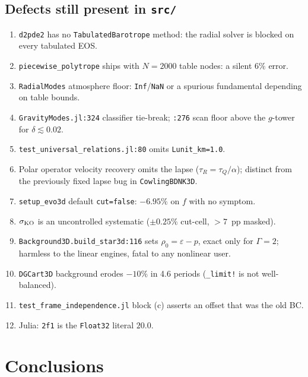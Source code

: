 \documentclass[aps,prd,preprint,amsmath,amssymb,nofootinbib,longbibliography]{revtex4-2}
\begin{document}
\subsection{Defects still present in \texttt{src/}}
\begin{enumerate}
\item \texttt{d2pde2} has no \texttt{TabulatedBarotrope} method: the radial solver is blocked on
every tabulated EOS.
\item \texttt{piecewise\_polytrope} ships with $N=2000$ table nodes: a silent $6\%$ error.
\item \texttt{RadialModes} atmosphere floor: \texttt{Inf}/\texttt{NaN} or a spurious fundamental
depending on table bounds.
\item \texttt{GravityModes.jl:324} classifier tie-break; \texttt{:276} scan floor above the
$g$-tower for $\delta\lesssim0.02$.
\item \texttt{test\_universal\_relations.jl:80} omits \texttt{Lunit\_km=1.0}.
\item Polar operator velocity recovery omits the lapse ($\tau_R = \tau_Q/\alpha$); distinct from
the previously fixed lapse bug in \texttt{CowlingBDNK3D}.
\item \texttt{setup\_evo3d} default \texttt{cut=false}: $-6.95\%$ on $f$ with no symptom.
\item $\sigma_{\rm KO}$ is an uncontrolled systematic ($\pm0.25\%$ cut-cell, $>7$~pp masked).
\item \texttt{Background3D.build\_star3d:116} sets $\rho_0 = \varepsilon - p$, exact only for
$\Gamma=2$; harmless to the linear engines, fatal to any nonlinear user.
\item \texttt{DGCart3D} background erodes $-10\%$ in 4.6 periods (\texttt{\_limit!} is not
well-balanced).
\item \texttt{test\_frame\_independence.jl} block (c) asserts an offset that was the old BC.
\item Julia: \texttt{2f1} is the \texttt{Float32} literal $20.0$.
\end{enumerate}

\section{Conclusions}
\end{document}
